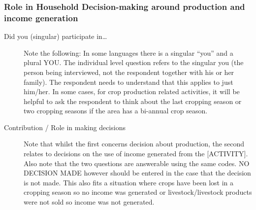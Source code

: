 \documentclass[a4paper]{refart}
\begin{document}
\subsubsection{Role in Household Decision-making around production and income generation}
\begin{description}
\item[Did you (singular) participate in\ldots]
Note the following:
In some languages there is a singular ``you'' and a plural YOU. The individual level question refers to the singular you (the person being interviewed, not the respondent together with his or her family). The respondent needs to understand that this applies to just him/her.
In some cases, for crop production related activities, it will be helpful to ask the respondent to think about the last cropping season or two cropping seasons if the area has a bi-annual crop season.
\item[Contribution / Role in making decisions] Note that whilst the first concerns decision about production, the second relates to decisions on the use of income generated from the [ACTIVITY]. Also note that the two questions are answerable using the same codes. NO DECISION MADE however should be entered in the case that the decision is not made. This also fits a situation where crops have been lost in a cropping season so no income was generated or livestock/livestock products were not sold so income was not generated.
\end{description}
\end{document}
